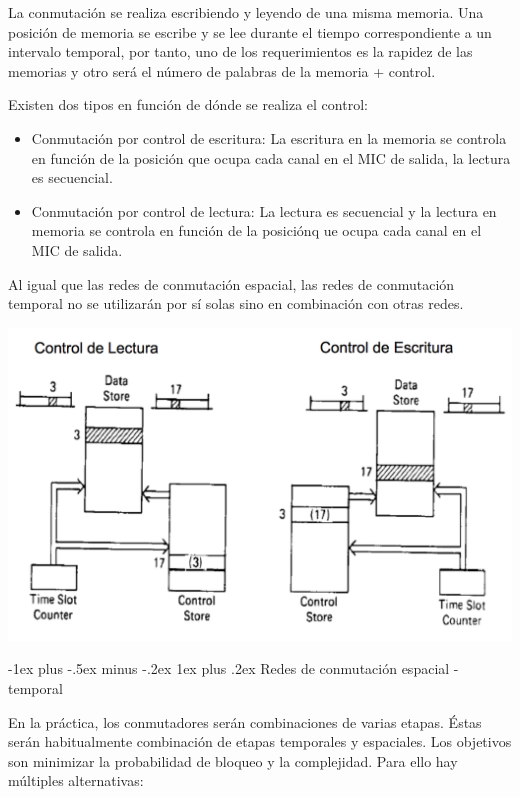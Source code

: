 \documentclass[10pt,portrait, twocolumn]{article}
\makeatletter
\renewcommand{\subsubsection}{\@startsection{subsubsection}{3}{0mm}%
                                {-1ex plus -.5ex minus -.2ex}%
                                {1ex plus .2ex}%
                                {\normalfont\small\bfseries}}
\makeatother
\begin{document}
La conmutación se realiza escribiendo y leyendo de una misma memoria. Una posición de memoria se escribe y se lee durante el tiempo correspondiente a un intervalo temporal, por tanto, uno de los requerimientos es la rapidez de las memorias y otro será el número de palabras de la memoria + control.

Existen dos tipos en función de dónde se realiza el control:

	\begin{itemize}
		\item Conmutación por control de escritura: La escritura en la memoria se controla en función de la posición que ocupa cada canal en el MIC de salida, la lectura es secuencial.
		\item Conmutación por control de lectura: La lectura es secuencial y la lectura en memoria se controla en función de la posiciónq ue ocupa cada canal en el MIC de salida.
	\end{itemize}
	
Al igual que las redes de conmutación espacial, las redes de conmutación temporal no se utilizarán por sí solas sino en combinación con otras redes.

	\begin{center}
		\includegraphics[scale = 0.3]{temporal2}
	\end{center}
	
\subsubsection{Redes de conmutación espacial - temporal}

En la práctica, los conmutadores serán combinaciones de varias etapas. Éstas serán habitualmente combinación de etapas temporales y espaciales. Los objetivos son minimizar la probabilidad de bloqueo y la complejidad. Para ello hay múltiples alternativas:
\end{document}
